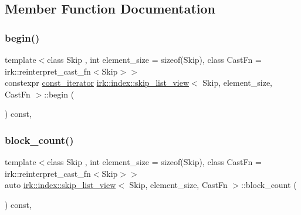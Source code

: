 \subsection{Member Function Documentation}
\mbox{\label{classirk_1_1index_1_1skip__list__view_a22e0239c33e18137997aad3da5337591}} 
\subsubsection{\texorpdfstring{begin()}{begin()}}
{\footnotesize\ttfamily template$<$class Skip , int element\+\_\+size = sizeof(\+Skip), class Cast\+Fn  = irk\+::reinterpret\+\_\+cast\+\_\+fn$<$\+Skip$>$$>$ \\
constexpr \mbox{\hyperlink{structirk_1_1index_1_1skip__list__view_1_1const__iterator}{const\+\_\+iterator}} \mbox{\hyperlink{classirk_1_1index_1_1skip__list__view}{irk\+::index\+::skip\+\_\+list\+\_\+view}}$<$ Skip, element\+\_\+size, Cast\+Fn $>$\+::begin (\begin{DoxyParamCaption}{ }\end{DoxyParamCaption}) const\hspace{0.3cm}{\ttfamily [inline]}, {\ttfamily [noexcept]}}

\mbox{\label{classirk_1_1index_1_1skip__list__view_a923176e9b8851cea6f32f530ad88d25c}} 
\subsubsection{\texorpdfstring{block\+\_\+count()}{block\_count()}}
{\footnotesize\ttfamily template$<$class Skip , int element\+\_\+size = sizeof(\+Skip), class Cast\+Fn  = irk\+::reinterpret\+\_\+cast\+\_\+fn$<$\+Skip$>$$>$ \\
auto \mbox{\hyperlink{classirk_1_1index_1_1skip__list__view}{irk\+::index\+::skip\+\_\+list\+\_\+view}}$<$ Skip, element\+\_\+size, Cast\+Fn $>$\+::block\+\_\+count (\begin{DoxyParamCaption}{ }\end{DoxyParamCaption}) const\hspace{0.3cm}{\ttfamily [inline]}, {\ttfamily [noexcept]}}

